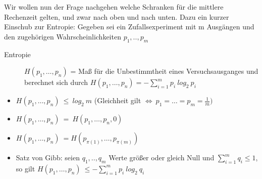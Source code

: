 Wir wollen nun der Frage nachgehen welche Schranken für die mittlere Rechenzeit gelten, und zwar nach oben und nach unten.
Dazu ein kurzer Einschub zur Entropie:
Gegeben sei ein Zufallsexperiment mit m Ausgängen und den zugehörigen Wahrscheinlichkeiten $p_1,..,p_m$
\begin{description}
    \item[Entropie] $H(p_1,\ldots,p_n)$ = Maß für die Unbestimmtheit eines Versuchsausganges und berechnet sich durch
     $H(p_1,\ldots,p_n)=-\sum_{i=1}^m p_i\:log_2\:p_i$
\end{description}

\begin{satz}
 \begin{itemize}
    \item $H(p_1,\ldots,p_n)\:\leq\:log_2\:m$ (Gleichheit gilt $\Leftrightarrow\:p_1=\ldots=p_m=\frac{1}{m})$
    \item $H(p_1,\ldots,p_n)\:=\:H(p_1,\ldots,p_n,0)$
    \item $H(p_1,\ldots,p_n)\:=H(p_{\pi(1)},\ldots,p_{\pi(m)})$
    \item Satz von Gibb: seien $q_1,..,q_m$ Werte größer oder gleich Null und $\sum_{i=1}^m q_i\leq1$, so gilt
     $H(p_1,\ldots,p_n)\:\leq-\sum_{i=1}^m p_i\:log_2\:q_i$
 \end{itemize}
\end{satz}

